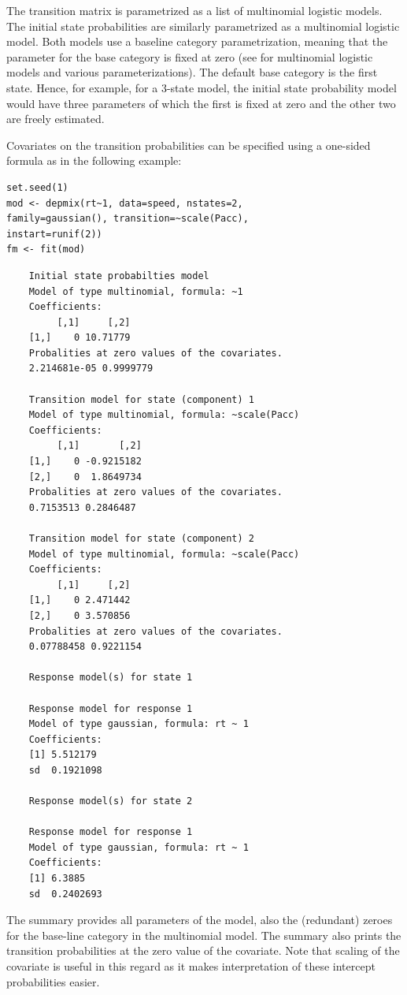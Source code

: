 \documentclass[article]{jss}
\begin{document}
The transition matrix is parametrized as a list of multinomial
logistic models.  The initial state probabilities are similarly
parametrized as a multinomial logistic model.  Both models use a
baseline category parametrization, meaning that the parameter for the
base category is fixed at zero (see \citet[see][p.\ 267
ff.]{Agresti2002} for multinomial logistic models and various
parameterizations).  The default base category is the first state.
Hence, for example, for a 3-state model, the initial state probability
model would have three parameters of which the first is fixed at zero
and the other two are freely estimated.

Covariates on the transition probabilities can be specified using a
one-sided formula as in the following example:
\begin{verbatim}
set.seed(1)
mod <- depmix(rt~1, data=speed, nstates=2, 
family=gaussian(), transition=~scale(Pacc), 
instart=runif(2))
fm <- fit(mod)
\end{verbatim}

\begin{verbatim}
	Initial state probabilties model 
	Model of type multinomial, formula: ~1
	Coefficients: 
		 [,1]     [,2]
	[1,]    0 10.71779
	Probalities at zero values of the covariates.
	2.214681e-05 0.9999779 

	Transition model for state (component) 1 
	Model of type multinomial, formula: ~scale(Pacc)
	Coefficients: 
		 [,1]       [,2]
	[1,]    0 -0.9215182
	[2,]    0  1.8649734
	Probalities at zero values of the covariates.
	0.7153513 0.2846487 

	Transition model for state (component) 2 
	Model of type multinomial, formula: ~scale(Pacc)
	Coefficients: 
		 [,1]     [,2]
	[1,]    0 2.471442
	[2,]    0 3.570856
	Probalities at zero values of the covariates.
	0.07788458 0.9221154 

	Response model(s) for state 1 

	Response model for response 1 
	Model of type gaussian, formula: rt ~ 1
	Coefficients: 
	[1] 5.512179
	sd  0.1921098 

	Response model(s) for state 2 

	Response model for response 1 
	Model of type gaussian, formula: rt ~ 1
	Coefficients: 
	[1] 6.3885
	sd  0.2402693 

\end{verbatim}

The summary provides all parameters of the model, also the 
(redundant) zeroes for the base-line category in the multinomial model. 
The summary also prints the transition probabilities at the zero value 
of the covariate. Note that scaling of the covariate is useful in this 
regard as it makes interpretation of these intercept probabilities 
easier. 
\end{document}
